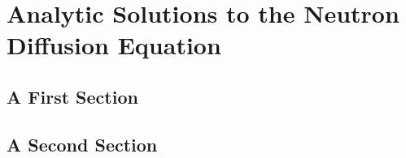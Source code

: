 \chapter{Analytic Solutions to the Neutron Diffusion Equation}

\section{A First Section}
\section{A Second Section}
